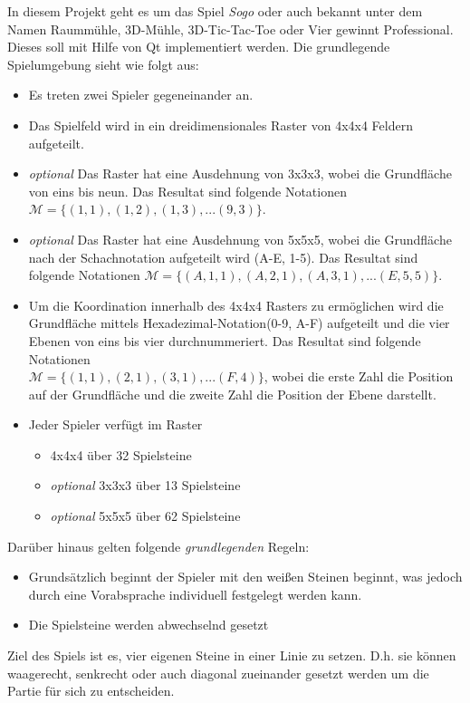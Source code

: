 \documentclass[a4paper]{scrartcl}
\begin{document}
In diesem Projekt geht es um das Spiel \textit{Sogo} oder auch bekannt unter dem Namen Raummühle, 3D-Mühle, 3D-Tic-Tac-Toe oder Vier gewinnt Professional. Dieses soll mit Hilfe von Qt implementiert werden. Die grundlegende Spielumgebung sieht wie folgt aus:
\begin{itemize}
	\item Es treten zwei Spieler gegeneinander an.
	\item Das Spielfeld wird in ein dreidimensionales Raster von 4x4x4 Feldern aufgeteilt.
	\item \textit{optional} Das Raster hat eine Ausdehnung von 3x3x3, wobei die Grundfläche von eins bis neun. Das Resultat sind folgende Notationen\\ $\mathcal{M}=\{(1,1),(1,2),(1,3),...(9,3)\}$.
	\item \textit{optional} Das Raster hat eine Ausdehnung von 5x5x5, wobei die Grundfläche nach der Schachnotation aufgeteilt wird (A-E, 1-5). Das Resultat sind folgende Notationen $\mathcal{M}=\{(A,1,1),(A,2,1),(A,3,1),...(E,5,5)\}$.
	\item Um die Koordination innerhalb des 4x4x4 Rasters zu ermöglichen wird die Grundfläche mittels Hexadezimal-Notation(0-9, A-F) aufgeteilt und die vier Ebenen von eins bis vier durchnummeriert. Das Resultat sind folgende Notationen\\ $\mathcal{M}=\{(1,1),(2,1),(3,1),...(F,4)\}$, wobei die erste Zahl die Position auf der Grundfläche und die zweite Zahl die Position der Ebene darstellt.
	\item Jeder Spieler verfügt im Raster
	\begin{itemize}
		\item 4x4x4 über 32 Spielsteine
		\item \textit{optional} 3x3x3 über 13 Spielsteine
		\item \textit{optional} 5x5x5 über 62 Spielsteine
	\end{itemize}	
\end{itemize}
Darüber hinaus gelten folgende \textit{grundlegenden} Regeln:
\begin{itemize}
	\item Grundsätzlich beginnt der Spieler mit den weißen Steinen beginnt, was jedoch durch eine Vorabsprache individuell festgelegt werden kann. 
	\item Die Spielsteine werden abwechselnd gesetzt
\end{itemize}
Ziel des Spiels ist es, vier eigenen Steine in einer Linie zu setzen. D.h. sie können waagerecht, senkrecht oder auch diagonal zueinander gesetzt werden um die Partie für sich zu entscheiden.
\end{document}
